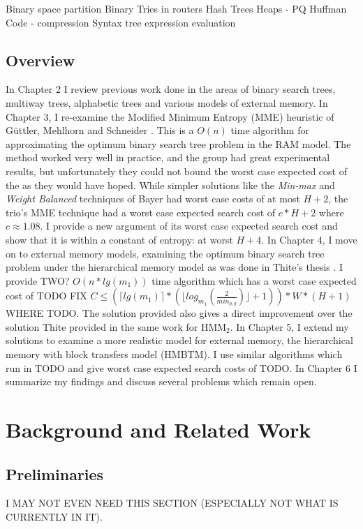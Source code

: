 \documentclass[letterpaper,12pt,titlepage,oneside,final]{book}
\theoremstyle{plain}
\begin{document}
Binary space partition
Binary Tries in routers
Hash Trees
Heaps - PQ
Huffman Code - compression
Syntax tree
expression evaluation

\section{Overview}

In Chapter 2 I review previous work done in the areas of binary search trees, multiway trees, alphabetic trees and various models of external memory. In Chapter 3, I re-examine the Modified Minimum Entropy (MME) heuristic of G{\"u}ttler, Mehlhorn and Schneider \cite{guttler1980binary}. This is a $O(n)$ time algorithm for approximating the optimum binary search tree problem in the RAM model. The method worked very well in practice, and the group had great experimental results, but unfortunately they could not bound the worst case expected cost of the as they would have hoped. While simpler solutions like the \textit{Min-max} and \textit{Weight Balanced} techniques of Bayer \cite{bayer1975improved} had worst case costs of at most $H+2$, the trio's MME technique had a worst case expected search cost of $c*H+2$ where $c \approx 1.08$. I provide a new argument of its worst case expected search cost and show that it is within a constant of entropy: at worst $H+4$. In Chapter 4, I move on to external memory models, examining the optimum binary search tree problem under the hierarchical memory model as was done in Thite's thesis \cite{thite2008optimum}. I provide TWO? $O(n*lg(m_1))$ time algorithm which has a worst case expected cost of TODO FIX $C \leq (\lceil lg(m_1) \rceil * (\lfloor log_{m_1}(\frac{2}{min_{p,q}}) \rfloor + 1)) * W * (H + 1)$ WHERE TODO. The solution provided also gives a direct improvement over the solution Thite provided in the same work for HMM$_2$. In Chapter 5, I extend my solutions to examine a more realistic model for external memory, the hierarchical memory with block transfers model (HMBTM). I use similar algorithms which run in TODO and give worst case expected search costs of TODO. In Chapter 6 I summarize my findings and discuss several problems which remain open.


\chapter{Background and Related Work}

\section{Preliminaries}
I MAY NOT EVEN NEED THIS SECTION (ESPECIALLY NOT WHAT IS CURRENTLY IN IT).
\end{document}
